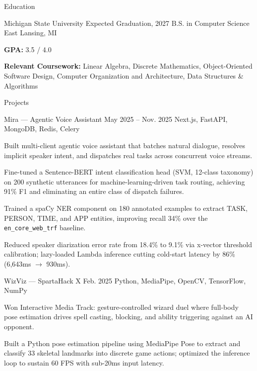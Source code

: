 \documentclass[
	11pt
]{../../../resume}
\begin{document}
	\begin{rSection}{E}{ducation}
		\begin{rSectionEntry}
			{Michigan State University}
			{Expected Graduation, 2027}
			{B.S. in Computer Science}
			{}
			{East Lansing, MI}

			\item \textbf{GPA:} 3.5 / 4.0
			\item \textbf{Relevant Coursework:} Linear Algebra, Discrete Mathematics, Object-Oriented Software Design, Computer Organization and Architecture, Data Structures \& Algorithms
		\end{rSectionEntry}
	\end{rSection}

	\begin{rSection}{P}{rojects}
		\begin{rSectionEntry}
			{Mira --- Agentic Voice Assistant}
			{May 2025 -- Nov. 2025}
			{}
			{Next.js, FastAPI, MongoDB, Redis, Celery}
			{}

			\item Built multi-client agentic voice assistant that batches natural dialogue, resolves implicit speaker intent, and dispatches real tasks across concurrent voice streams.
			\item Fine-tuned a Sentence-BERT intent classification head (SVM, 12-class taxonomy) on 200 synthetic utterances for machine-learning-driven task routing, achieving 91\% F1 and eliminating an entire class of dispatch failures.
			\item Trained a spaCy NER component on 180 annotated examples to extract TASK, PERSON, TIME, and APP entities, improving recall 34\% over the \texttt{en\_core\_web\_trf} baseline.
			\item Reduced speaker diarization error rate from 18.4\% to 9.1\% via x-vector threshold calibration; lazy-loaded Lambda inference cutting cold-start latency by 86\% (6{,}643ms $\rightarrow$ 930ms).
		\end{rSectionEntry}

		\begin{rSectionEntry}
			{WizViz --- SpartaHack X}
			{Feb. 2025}
			{}
			{Python, MediaPipe, OpenCV, TensorFlow, NumPy}
			{}

			\item Won Interactive Media Track: gesture-controlled wizard duel where full-body pose estimation drives spell casting, blocking, and ability triggering against an AI opponent.
			\item Built a Python pose estimation pipeline using MediaPipe Pose to extract and classify 33 skeletal landmarks into discrete game actions; optimized the inference loop to sustain 60 FPS with sub-20ms input latency.
		\end{rSectionEntry}
	\end{rSection}
\end{document}
